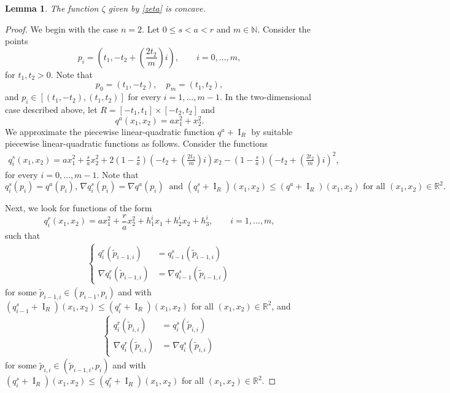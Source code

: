 \documentclass[11pt]{article}
\newtheorem{lema}[teo]{Lemma}
\theoremstyle{definition} %
\DeclareMathOperator{\I}{I}
\begin{document}
\begin{lema}\label{conccave}
The function $\zeta$ given by \eqref{zeta} is concave.
\end{lema}

\begin{proof}
We begin with the case $n=2$. Let $0\leq s<a<r$ and $m\in \mathbb{N}$. Consider the points
$$p_i=\left(t_1, -t_2+\left(\frac{2t_2}{m}\right)i\right), \qquad i=0,\dots, m,$$
for $t_1,t_2>0$. 
Note that
$$p_0=(t_1,-t_2), \quad  p_m=(t_1,t_2),$$
and $p_i\in [(t_1,-t_2), (t_1,t_2)]$ for every $i=1, \dots, m-1$. In the two-dimensional case described above, let  $R=[-t_1,t_1]\times[-t_2,t_2]$ and  
$$q^a(x_1,x_2)= ax_1^2+x_2^2.$$
We  approximate the piecewise linear-quadratic function $q^a+\I_R$ by  suitable piecewise linear-quadratic functions as follows. Consider the functions
\begin{align*}
q_i^s(x_1,x_2)= ax_1^2 +\frac{s}{a}x_2^2 + 2\left(1-\frac{s}{a}\right)\left(-t_2+\left(\frac{2t_2}{m}\right)i\right)x_2-\left(1-\frac{s}{a}\right)\left(-t_2+\left(\frac{2t_2}{m}\right)i\right)^2,
\end{align*}
for every $i=0,\dots, m-1$. Note that
$$q_i^s(p_i)=q^a(p_i), \, \nabla q_i^s(p_i)= \nabla q^a(p_i) \ \mbox{ and } (q_i^s+\I_R)(x_1,x_2)  \leq (q^a+\I_R)(x_1,x_2) \mbox{ for all } (x_1,x_2)\in \mathbb{R}^2.$$





Next, we look for functions of the form
$$q_i^r(x_1,x_2)= ax_1^2 +\frac{r}{a}x_2^2+h_1^ix_1+h_2^ix_2+h_3^i, \qquad i=1,\dots,m,$$
such that
\begin{align}\label{gi-1h}
\begin{cases}q_i^r(\tilde{p}_{i-1,i}) &= q_{i-1}^s(\tilde{p}_{i-1,i})  \\
 \nabla q_i^r(\tilde{p}_{i-1,i}) &= \nabla q_{i-1}^s(\tilde{p}_{i-1,i})  
 \end{cases}
\end{align}
for  some $\tilde{p}_{i-1,i} \in (p_{i-1},p_i)$ and  with $(q_{i-1}^s+ \I_R)(x_1,x_2)\leq (q_i^r+\I_{R})(x_1,x_2)$ for all  $(x_1,x_2)\in \mathbb{R}^2$, and 
\begin{align}\label{gih}
   \begin{cases} q_i^r(\tilde{p}_{i,i}) &= q_{i}^s(\tilde{p}_{i,i}) \\
  \nabla q_i^r (\tilde{p}_{i,i}) &= \nabla q_{i}^s(\tilde{p}_{i,i})
  \end{cases}
\end{align}
for  some $\tilde{p}_{i,i} \in (\tilde{p}_{i-1,i},p_i)$ and with $(q_{i}^s+ \I_R)(x_1,x_2)\leq (q_i^r+\I_{R})(x_1,x_2)$ for all  $(x_1,x_2)\in \mathbb{R}^2$.



\end{proof}
\end{document}
